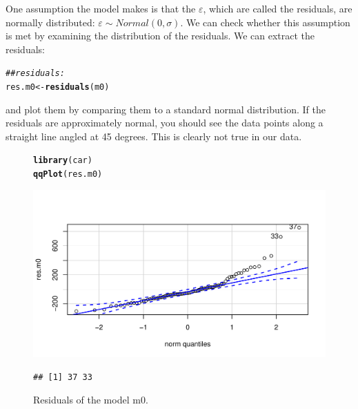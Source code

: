 \documentclass[12pt]{book}\usepackage[]{graphicx}\usepackage[]{color}
\makeatletter
\def\maxwidth{ %
  \ifdim\Gin@nat@width>\linewidth
    \linewidth
  \else
    \Gin@nat@width
  \fi
}
\newcommand{\hlcom}[1]{\textcolor[rgb]{0.678,0.584,0.686}{\textit{#1}}}%
\newcommand{\hlstd}[1]{\textcolor[rgb]{0.345,0.345,0.345}{#1}}%
\newcommand{\hlkwb}[1]{\textcolor[rgb]{0.69,0.353,0.396}{#1}}%
\newcommand{\hlkwd}[1]{\textcolor[rgb]{0.737,0.353,0.396}{\textbf{#1}}}%
\newenvironment{kframe}{%
 \def\at@end@of@kframe{}%
 \ifinner\ifhmode%
  \def\at@end@of@kframe{\end{minipage}}%
  \begin{minipage}{\columnwidth}%
 \fi\fi%
 \def\FrameCommand##1{\hskip\@totalleftmargin \hskip-\fboxsep
 \colorbox{shadecolor}{##1}\hskip-\fboxsep
     \hskip-\linewidth \hskip-\@totalleftmargin \hskip\columnwidth}%
 \MakeFramed {\advance\hsize-\width
   \@totalleftmargin\z@ \linewidth\hsize
   \@setminipage}}%
 {\par\unskip\endMakeFramed%
 \at@end@of@kframe}
\newenvironment{knitrout}{}{} %
\makeatother
\begin{document}
One assumption the model makes is that the $\varepsilon$, which are called the residuals, are normally distributed: $\varepsilon \sim Normal(0,\sigma)$. We can check whether this assumption is met by examining the distribution of the residuals.
We can extract the residuals:

\begin{knitrout}
\color{fgcolor}\begin{kframe}
\begin{alltt}
\hlcom{## residuals:}
\hlstd{res.m0}\hlkwb{<-}\hlkwd{residuals}\hlstd{(m0)}
\end{alltt}
\end{kframe}
\end{knitrout}


and plot them by comparing them to a standard normal distribution. If the residuals are approximately normal, you should see the data points along a straight line angled at 45 degrees. This is clearly not true in our data.

\begin{figure}[!htbp]
\centering
\begin{knitrout}
\color{fgcolor}\begin{kframe}
\begin{alltt}
\hlkwd{library}\hlstd{(car)}
\hlkwd{qqPlot}\hlstd{(res.m0)}
\end{alltt}
\end{kframe}
\includegraphics[width=\maxwidth]{figure/unnamed-chunk-91-1} 
\begin{kframe}\begin{verbatim}
## [1] 37 33
\end{verbatim}
\end{kframe}
\end{knitrout}
\caption{Residuals of the model m0.}
\label{fig:residuals}
\end{figure}
\end{document}

